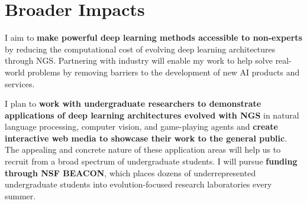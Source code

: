 \section{Broader Impacts}

I aim to \textbf{make powerful deep learning methods accessible to non-experts} by reducing the computational cost of evolving deep learning architectures through NGS.
Partnering with industry will enable my work to help solve real-world problems by removing barriers to the development of new AI products and services.

I plan to \textbf{work with undergraduate researchers to demonstrate applications of deep learning architectures evolved with NGS} in natural language processing, computer vision, and game-playing agents and \textbf{create interactive web media to showcase their work to the general public}.
The appealing and concrete nature of these application areas will help us to recruit from a broad spectrum of undergraduate students.
I will pursue \textbf{funding through NSF BEACON}, which places dozens of underrepresented undergraduate students into evolution-focused research laboratories every summer.
